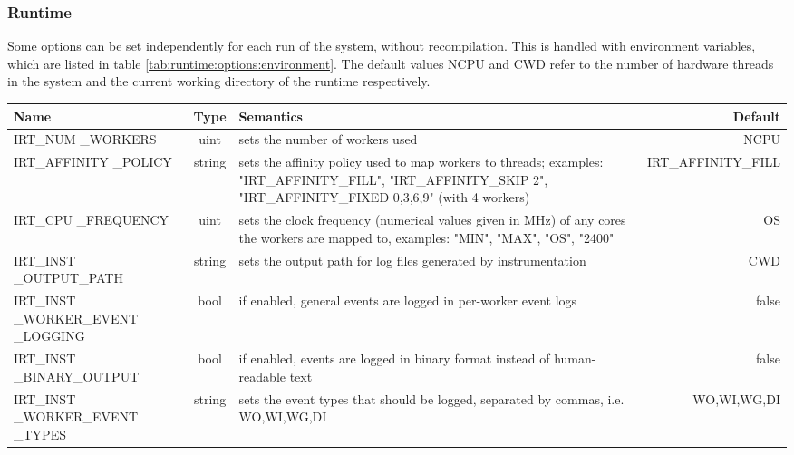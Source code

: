 \subsubsection{Runtime}
Some options can be set independently for each run of the system, without recompilation. This is handled with environment variables, which are listed in table \ref{tab:runtime:options:environment}. The default values NCPU and CWD refer to the number of hardware threads in the system and the current working directory of the runtime respectively.

\begin{table}[htbp] \small
	\centering
    \begin{tabular}{|p{3cm}|c|p{7cm}|r|}
        \hline
        Name                              & Type   & Semantics                                                                                                       & Default       \\ \hline \hline
        IRT\_NUM \_WORKERS                 & uint   & sets the number of workers used                                                                                 & NCPU                \\ \hline
        IRT\_AFFINITY \_POLICY             & string & sets the affinity policy used to map workers to threads; examples: "IRT\_AFFINITY\_FILL", "IRT\_AFFINITY\_SKIP 2", "IRT\_AFFINITY\_FIXED 0,3,6,9" (with 4 workers)                                                         & IRT\_AFFINITY\_FILL \\ \hline
	IRT\_CPU \_FREQUENCY                & uint   & sets the clock frequency (numerical values given in MHz) of any cores the workers are mapped to, examples: "MIN", "MAX", "OS", "2400"  & OS        \\ \hline
        IRT\_INST \_OUTPUT\_PATH           & string & sets the output path for log files generated by instrumentation                                                 & CWD                 \\ \hline
        IRT\_INST \_WORKER\_EVENT \_LOGGING & bool   & if enabled, general events are logged in per-worker event logs                                                  & false               \\ \hline
	IRT\_INST \_BINARY\_OUTPUT          & bool    & if enabled, events are logged in binary format instead of human-readable text                                   & false               \\ \hline
	IRT\_INST \_WORKER\_EVENT \_TYPES    & string  & sets the event types that should be logged, separated by commas, i.e. WO,WI,WG,DI                               & WO,WI,WG,DI         \\ \hline

\end{tabular}
\end{table}
